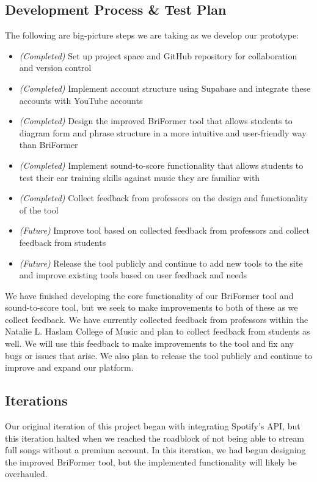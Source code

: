 \documentclass[12pt, letterpaper]{article}
\begin{document}
\subsection*{Development Process \& Test Plan}
The following are big-picture steps we are taking as we develop our prototype:
\begin{itemize}
	\item[] \textit{(Completed)} Set up project space and GitHub repository for collaboration and version control
	\item[] \textit{(Completed)} Implement account structure using Supabase and integrate these accounts with YouTube accounts
	\item[] \textit{(Completed)} Design the improved BriFormer tool that allows students to diagram form and phrase structure in a more intuitive and user-friendly way than BriFormer
	\item[] \textit{(Completed)} Implement sound-to-score functionality that allows students to test their ear training skills against music they are familiar with
	\item[] \textit{(Completed)} Collect feedback from professors on the design and functionality of the tool
	\item[] \textit{(Future)} Improve tool based on collected feedback from professors and collect feedback from students
	\item[] \textit{(Future)} Release the tool publicly and continue to add new tools to the site and improve existing tools based on user feedback and needs
\end{itemize}

We have finished developing the core functionality of our BriFormer tool and sound-to-score tool, but we seek to make improvements to both of these as we collect feedback.  We have currently collected feedback from professors within the Natalie L. Haslam College of Music and plan to collect feedback from students as well.  We will use this feedback to make improvements to the tool and fix any bugs or issues that arise.  We also plan to release the tool publicly and continue to improve and expand our platform.

\subsection*{Iterations}

Our original iteration of this project began with integrating Spotify's API, but this iteration halted when we reached the roadblock of not being able to stream full songs without a premium account.  In this iteration, we had begun designing the improved BriFormer tool, but the implemented functionality will likely be overhauled.
\end{document}

